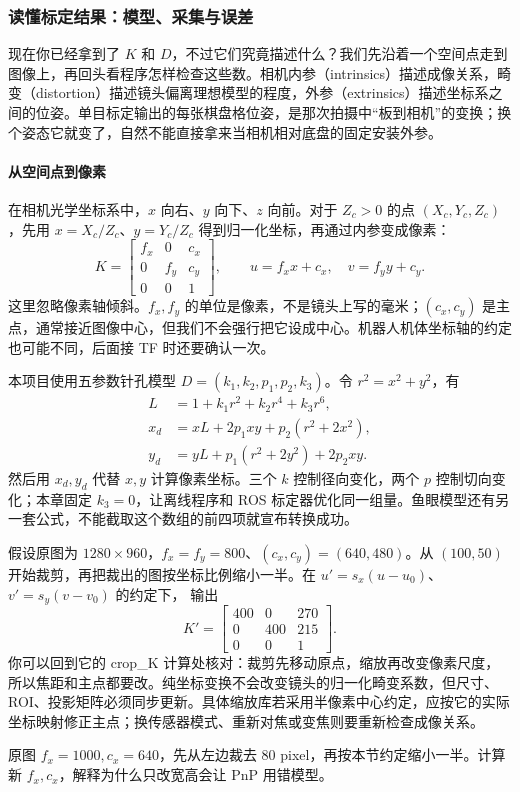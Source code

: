 \subsubsection{读懂标定结果：模型、采集与误差}
\label{sec:camera-calibration-detail}

现在你已经拿到了 $K$ 和 $D$，不过它们究竟描述什么？我们先沿着一个空间点走到图像上，再回头看程序怎样检查这些数。相机内参（intrinsics）描述成像关系，畸变（distortion）描述镜头偏离理想模型的程度，外参（extrinsics）描述坐标系之间的位姿。单目标定输出的每张棋盘格位姿，是那次拍摄中“板到相机”的变换；换个姿态它就变了，自然不能直接拿来当相机相对底盘的固定安装外参。

\paragraph*{从空间点到像素}
在相机光学坐标系中，$x$ 向右、$y$ 向下、$z$ 向前。对于 $Z_c>0$ 的点 $(X_c,Y_c,Z_c)$，先用 $x=X_c/Z_c$、$y=Y_c/Z_c$ 得到归一化坐标，再通过内参变成像素：
\[
K=\begin{bmatrix}f_x&0&c_x\\0&f_y&c_y\\0&0&1\end{bmatrix},
\qquad u=f_xx+c_x,\quad v=f_yy+c_y.
\]
这里忽略像素轴倾斜。$f_x,f_y$ 的单位是像素，不是镜头上写的毫米；$(c_x,c_y)$ 是主点，通常接近图像中心，但我们不会强行把它设成中心。机器人机体坐标轴的约定也可能不同，后面接 TF 时还要确认一次。

本项目使用五参数针孔模型 $D=(k_1,k_2,p_1,p_2,k_3)$。令 $r^2=x^2+y^2$，有
\begin{align*}
L&=1+k_1r^2+k_2r^4+k_3r^6,\\
x_d&=xL+2p_1xy+p_2(r^2+2x^2),\\
y_d&=yL+p_1(r^2+2y^2)+2p_2xy.
\end{align*}
然后用 $x_d,y_d$ 代替 $x,y$ 计算像素坐标。三个 $k$ 控制径向变化，两个 $p$ 控制切向变化；本章固定 $k_3=0$，让离线程序和 ROS 标定器优化同一组量。鱼眼模型还有另一套公式，不能截取这个数组的前四项就宣布转换成功。

\begin{example}
假设原图为 $1280\times960$，$f_x=f_y=800$、$(c_x,c_y)=(640,480)$。从 $(100,50)$ 开始裁剪，再把裁出的图按坐标比例缩小一半。在 $u'=s_x(u-u_0)$、$v'=s_y(v-v_0)$ 的约定下， 输出
\[
K'=\begin{bmatrix}400&0&270\\0&400&215\\0&0&1\end{bmatrix}.
\]
你可以回到它的 crop\_K 计算处核对：裁剪先移动原点，缩放再改变像素尺度，所以焦距和主点都要改。纯坐标变换不会改变镜头的归一化畸变系数，但尺寸、ROI、投影矩阵必须同步更新。具体缩放库若采用半像素中心约定，应按它的实际坐标映射修正主点；换传感器模式、重新对焦或变焦则要重新检查成像关系。
\end{example}
\begin{exercise}\label{ex:v2-camera-crop}
原图 $f_x=1000,c_x=640$，先从左边裁去 80 pixel，再按本节约定缩小一半。计算新 $f_x,c_x$，解释为什么只改宽高会让 PnP 用错模型。
\end{exercise}

